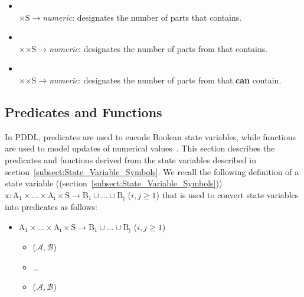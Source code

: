 \begin{itemize}
\item {}\\ $\mathrm{\times S \rightarrow}$\textit{numeric}: designates the number of parts that  contains.

\item {}\\ $\mathrm{\times}$$\mathrm{\times S \rightarrow}$\textit{numeric}: designates the number of parts from  that  contains.

\item {}\\ $\mathrm{\times}$$\mathrm{\times S \rightarrow}$\textit{numeric}: designates the number of parts from  that  \textbf{can} contain.

\end{itemize}



\subsection{Predicates and Functions}
In PDDL, predicates are used to encode Boolean state variables, while functions are used to model updates of numerical values~\cite{FOXandLong.2003}. This section describes the predicates and functions derived from the state variables described in section~\ref{subsect:State_Variable_Symbols}. We recall the following definition of a state variable ((section~\ref{subsect:State_Variable_Symbols})) $\mathrm{x: A_1\times \dots\times A_i\times S\rightarrow B_1\cup\dots\cup B_j}$ ($i, j\geq 1$) that is used to convert state variables into predicates as follows:

\begin{itemize}
 \item $\mathrm{A_1\times \dots\times A_i\times S\rightarrow B_1\cup\dots\cup B_j}$ ($i, j\geq 1$)
  \begin{itemize}
  \item {}($\mathcal{A,B}$)
  \item \ldots
  \item {}($\mathcal{A,B}$)
  \end{itemize}
\end{itemize}

